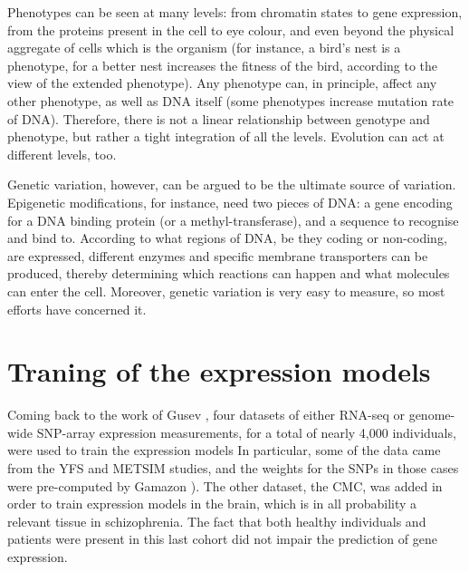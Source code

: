 \documentclass[../main.tex]{subfiles}
\begin{document}
Phenotypes can be seen at many levels: from chromatin states to gene 
expression, from the proteins present in the cell to eye colour, and 
even beyond the physical aggregate of cells which is the organism (for 
instance, a bird's nest is a phenotype, for a better nest increases the 
fitness of the bird, according to the view of the extended 
phenotype\cite{Dawkins1982}). Any phenotype can, in principle, affect 
any other phenotype, as well as DNA itself (\eg some phenotypes increase 
mutation rate of DNA). Therefore, there is not a linear relationship 
between genotype and phenotype, but rather a tight integration of all 
the levels. Evolution can act at different levels, too.

Genetic variation, however, can be argued to be the ultimate source of 
variation. Epigenetic modifications, for instance, need two pieces of 
DNA: a gene encoding for a DNA binding protein (or a 
methyl-transferase), and a sequence to recognise and bind to. According 
to what regions of DNA, be they coding or non-coding, are expressed, 
different enzymes and specific membrane transporters can be produced, 
thereby determining which reactions can happen and what molecules can 
enter the cell\cite{Alberts2014}. Moreover, genetic variation is very 
easy to measure, so most efforts have concerned it.

\section{Traning of the expression models}

Coming back to the work of Gusev \etal, four datasets of either RNA-seq 
or genome-wide SNP-array expression measurements, for a total of nearly 
4,000 individuals,  were used to train the expression 
models In particular, some 
of the data came from the YFS and METSIM studies, and the weights for 
the SNPs in those cases were pre-computed by Gamazon ). The 
other dataset, the CMC, was added in order to train expression models in 
the brain, which is in all probability a relevant tissue in 
schizophrenia. The fact that both healthy individuals and patients were 
present in this last cohort did not impair the prediction of gene 
expression.
\end{document}

